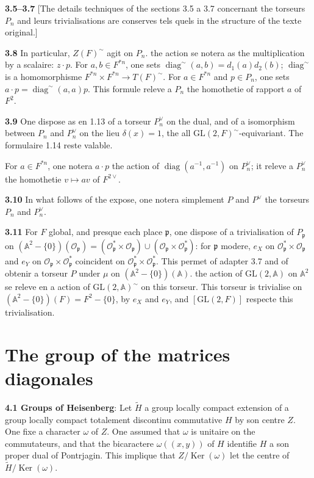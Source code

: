 \documentclass[12pt,a4paper]{article}
\theoremstyle{plain}
\theoremstyle{definition}
\theoremstyle{remark}
\DeclareMathOperator{\diag}{diag}
\DeclareMathOperator{\Ker}{Ker}
\newcommand{\Af}{\mathbb{A}}
\newcommand{\cO}{\mathcal{O}}
\newcommand{\frakp}{\mathfrak{p}}
\newcommand{\wt}{\widetilde}
\providecommand{\AA}{\mathbb{A}}
\providecommand{\cO}{\mathcal{O}}
\providecommand{\frakp}{\mathfrak{p}}
\providecommand{\Ker}{\operatorname{Ker}}
\begin{document}
\textbf{3.5--3.7} [The details techniques of the sections 3.5 a 3.7 concernant the torseurs $P_n$ and leurs trivialisations are conserves tels quels in the structure of the texte original.]

\textbf{3.8} In particular, $Z(F)^\sim$ agit on $P_n$. the action se notera as the multiplication by a scalaire: $z \cdot p$. For $a, b \in F^{*n}$, one sets $\diag^\sim(a, b) = d_1(a) d_2(b)$; $\diag^\sim$ is a homomorphisme $F^{*n} \times F^{*n} \to T(F)^\sim$. For $a \in F^{*n}$ and $p \in P_n$, one sets $a \cdot p = \diag^\sim(a, a) p$. This formule releve a $P_n$ the homothetie of rapport $a$ of $F^2$.

\textbf{3.9} One dispose as en 1.13 of a torseur $P_n^\vee$ on the dual, and of a isomorphism between $P_n$ and $P_n^\vee$ on the lieu $\delta(x) = 1$, the all $\mathrm{GL}(2, F)^\sim$-equivariant. The formulaire 1.14 reste valable.

For $a \in F^{*n}$, one notera $a \cdot p$ the action of $\diag(a^{-1}, a^{-1})$ on $P_n^\vee$; it releve a $P_n^\vee$ the homothetie $v \mapsto av$ of $F^{2\vee}$.

\textbf{3.10} In what follows of the expose, one notera simplement $P$ and $P^\vee$ the torseurs $P_n$ and $P_n^\vee$.

\textbf{3.11} For $F$ global, and presque each place $\frakp$, one dispose of a trivialisation of $P_\frakp$ on $(\AA^2 - \{0\})(\cO_\frakp) = (\cO_\frakp^* \times \cO_\frakp) \cup (\cO_\frakp \times \cO_\frakp^*)$: for $\frakp$ modere, $e_X$ on $\cO_\frakp^* \times \cO_\frakp$ and $e_Y$ on $\cO_\frakp \times \cO_\frakp^*$ coincident on $\cO_\frakp^* \times \cO_\frakp^*$. This permet of adapter 3.7 and of obtenir a torseur $P$ under $\mu$ on $(\AA^2 - \{0\})(\Af)$. the action of $\mathrm{GL}(2, \Af)$ on $\Af^2$ se releve en a action of $\mathrm{GL}(2, \Af)^\sim$ on this torseur. This torseur is trivialise on $(\AA^2 - \{0\})(F) = F^2 - \{0\}$, by $e_X$ and $e_Y$, and $[\mathrm{GL}(2, F)]$ respecte this trivialisation.

\section{The group of the matrices diagonales}

\textbf{4.1 Groups of Heisenberg}: Let $\wt{H}$ a group locally compact extension of a group locally compact totalement discontinu commutative $H$ by son centre $Z$. One fixe a character $\omega$ of $Z$. One assumed that $\omega$ is unitaire on the commutateurs, and that the bicaractere $\omega((x, y))$ of $H$ identifie $H$ a son proper dual of Pontrjagin. This implique that $Z / \Ker(\omega)$ let the centre of $\wt{H} / \Ker(\omega)$.
\end{document}
